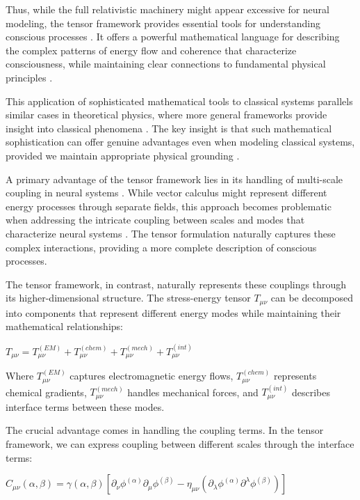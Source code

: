 \begin{refsection}
Thus, while the full relativistic machinery might appear excessive for neural modeling, the tensor framework provides essential tools for understanding conscious processes \cite{varela2016embodied}. It offers a powerful mathematical language for describing the complex patterns of energy flow and coherence that characterize consciousness, while maintaining clear connections to fundamental physical principles \cite{rovelli2018order}.

This application of sophisticated mathematical tools to classical systems parallels similar cases in theoretical physics, where more general frameworks provide insight into classical phenomena \cite{langer2009philosophy}. The key insight is that such mathematical sophistication can offer genuine advantages even when modeling classical systems, provided we maintain appropriate physical grounding \cite{chalmers2010character}.

A primary advantage of the tensor framework lies in its handling of multi-scale coupling in neural systems \cite{deacon2011incomplete}. While vector calculus might represent different energy processes through separate fields, this approach becomes problematic when addressing the intricate coupling between scales and modes that characterize neural systems \cite{thompson2014waking}. The tensor formulation naturally captures these complex interactions, providing a more complete description of conscious processes.

The tensor framework, in contrast, naturally represents these couplings through its higher-dimensional structure. The stress-energy tensor $T_{\mu\nu}$ can be decomposed into components that represent different energy modes while maintaining their mathematical relationships:

$T_{\mu\nu} = T^{(EM)}_{\mu\nu} + T^{(chem)}_{\mu\nu} + T^{(mech)}_{\mu\nu} + T^{(int)}_{\mu\nu}$

Where $T^{(EM)}_{\mu\nu}$ captures electromagnetic energy flows, $T^{(chem)}_{\mu\nu}$ represents chemical gradients, $T^{(mech)}_{\mu\nu}$ handles mechanical forces, and $T^{(int)}_{\mu\nu}$ describes interface terms between these modes.

The crucial advantage comes in handling the coupling terms. In the tensor framework, we can express coupling between different scales through the interface terms:

$C_{\mu\nu}(\alpha,\beta) = \gamma(\alpha,\beta)[\partial_\nu\phi^{(\alpha)}\partial_\mu\phi^{(\beta)} - \eta_{\mu\nu}(\partial_\lambda\phi^{(\alpha)}\partial^\lambda\phi^{(\beta)})]$


\end{refsection}
